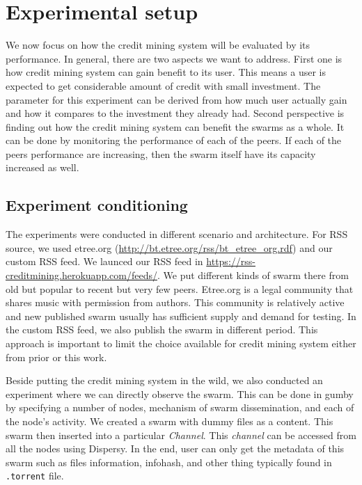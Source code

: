\section{Experimental setup}
\label{section:cmexp}
We now focus on how the credit mining system will be evaluated by its performance. In general, there are two aspects we want to address. First one is how credit mining system can gain benefit to its user. This means a user is expected to get considerable amount of credit with small investment. The parameter for this experiment can be derived from how much user actually gain and how it compares to the investment they already had. Second perspective is finding out how the credit mining system can benefit the swarms as a whole. It can be done by monitoring the performance of each of the peers. If each of the peers performance are increasing, then the swarm itself have its capacity increased as well.

\subsection{Experiment conditioning}
The experiments were conducted in different scenario and architecture. For RSS source, we used etree.org (\url{http://bt.etree.org/rss/bt_etree_org.rdf}) and our custom RSS feed. We launced our RSS feed in \url{https://rss-creditmining.herokuapp.com/feeds/}. We put different kinds of swarm there from old but popular to recent but very few peers. Etree.org is a legal community that shares music with permission from authors. This community is relatively active and new published swarm usually has sufficient supply and demand for testing. In the custom RSS feed, we also publish the swarm in different period. This approach is important to limit the choice available for credit mining system either from prior or this work. 

Beside putting the credit mining system in the wild, we also conducted an experiment where we can directly observe the swarm. This can be done in gumby by specifying a number of nodes, mechanism of swarm dissemination, and each of the node's activity. We created a swarm with dummy files as a content. This swarm then inserted into a particular \textit{Channel}. This \textit{channel} can be accessed from all the nodes using Dispersy. In the end, user can only get the metadata of this swarm such as files information, infohash, and other thing typically found in \texttt{.torrent} file. 

